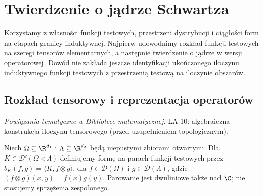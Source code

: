 \setcounter{section}{9}
\section{Twierdzenie o jądrze Schwartza}
\label{sec:dt-schwartz-kernel}
\providecommand{\atlasref}[2]{#2}

Korzystamy z własności funkcji testowych, przestrzeni
dystrybucji i ciągłości form na etapach granicy induktywnej.
Najpierw udowodnimy rozkład funkcji testowych na szeregi
tensorów elementarnych, a następnie twierdzenie o jądrze
w wersji operatorowej. Dowód nie zakłada jeszcze
identyfikacji ukończonego iloczynu induktywnego funkcji
testowych z przestrzenią testową na iloczynie obszarów.

\subsection{Rozkład tensorowy i reprezentacja operatorów}

\noindent\emph{Powiązania tematyczne w Bibliotece matematycznej:} \atlasref{LA-10::thm:lin10-istnienie}{LA-10: algebraiczna konstrukcja iloczynu tensorowego (przed uzupełnieniem topologicznym)}.


\begin{definicja}
\label{def:kernel-pair23}
Niech $\Omega\subseteq\R^{d_1}$ i
$\Lambda\subseteq\R^{d_2}$ będą niepustymi zbiorami otwartymi.
Dla $K\in\mathcal D'(\Omega\times\Lambda)$ definiujemy
formę na parach funkcji testowych przez
$b_K(f,g)=\langle K,f\otimes g\rangle$,
dla $f\in\mathcal D(\Omega)$ i $g\in\mathcal D(\Lambda)$,
gdzie $(f\otimes g)(x,y)=f(x)g(y)$.
Parowanie jest dwuliniowe także nad $\C$; nie stosujemy
sprzężenia zespolonego.
\end{definicja}

